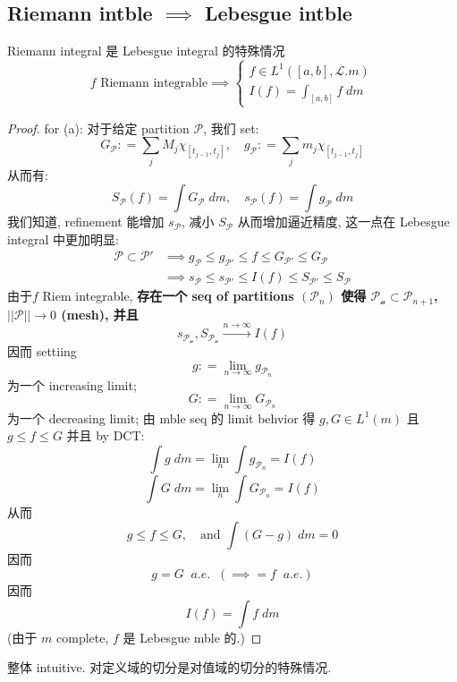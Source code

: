 \documentclass[lang=cn,11pt]{elegantbook}
\begin{document}
\subsection{Riemann intble $\implies$ Lebesgue intble  }
\begin{theorem}{Riemann integral 是 Lebesgue integral 的特殊情况}
\[  f \text{ Riemann integrable} \implies\begin{cases}
        f \in L^1([a,b], \mathcal{L}. m) \\
        I(f) = \int_{[a,b]} f \; dm
    \end{cases} \]
\end{theorem}
\begin{proof}
    for (a): 对于给定 partition $\mathcal{P}$, 我们 set: \[
    G_\mathcal{P} : = \sum_j M_j  \chi_{[t_{j-1},t_j]} , \quad     g_\mathcal{P} : = \sum_j m_j  \chi_{[t_{j-1},t_j]} 
    \]
    从而有: \[
    S_\mathcal{P}(f) = \int G_\mathcal{P} \; dm , \quad s_\mathcal{P}(f) = \int g_\mathcal{P} \; dm
    \]
    我们知道, refinement 能增加 $s_\mathcal{P}$, 减小 $S_\mathcal{P}$ 从而增加逼近精度, 这一点在 Lebesgue integral 中更加明显: \begin{align}
 \mathcal{P } \subset \mathcal{P}' &\implies g_\mathcal{P} \leq g_\mathcal{P'} \leq f \leq G_{\mathcal{P}'} \leq  G_\mathcal{P}         \\
 & \implies s_\mathcal{P} \leq s_{\mathcal{P}'} \leq I(f) \leq S_\mathcal{P'} \leq S_\mathcal{P}
    \end{align}
由于$f$ Riem integrable, \textbf{存在一个 seq of partitions $(\mathcal{P}_n)$ 使得 $\mathcal{P_n}\subset \mathcal{P}_{n+1}$, $||\mathcal{P}|| \to 0$ (mesh), 并且} \[
s_{\mathcal{P_n}}, S_{\mathcal{P_n}} \overset{n \to \infty}{\longrightarrow}  I(f)
\]
因而 settiing \[
g : = \lim_{n\to \infty} g_{\mathcal{P}_n} 
\] 为一个 increasing limit; \[
G : = \lim_{n\to \infty} G_{\mathcal{P}_n} 
\] 为一个 decreasing limit; 由 mble seq 的 limit behvior 得 $g,G \in L^1(m)$ 且 $g \leq f \leq G$
并且 by DCT: \[
\int g \; dm = \lim_n \int g_{\mathcal{P}_n} = I(f) 
\]\[
\int G \; dm = \lim_n \int G_{\mathcal{P}_n} = I(f) 
\]
从而 \[
g \leq f \leq G , \quad \text{and }  \int (G-g) \; dm = 0
\]因而 \[ g =G \;\; a.e.  \;\;(\implies = f \;\; a.e.)
\]
因而 \[
I(f)  = \int f  \; dm
\]
(由于  $m$ complete, $f$ 是 Lebesgue mble 的.)
\end{proof}
\begin{remark}
    整体 intuitive. 对定义域的切分是对值域的切分的特殊情况. 
\end{remark}
\end{document}
